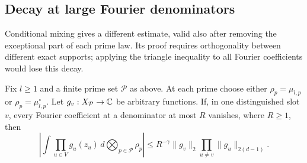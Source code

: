 \subsection{Decay at large Fourier denominators}

Conditional mixing gives a different estimate, valid also after
removing the exceptional part of each prime law.  Its proof requires
orthogonality between different exact supports; applying the triangle
inequality to all Fourier coefficients would lose this decay.

\begin{lemma}
\label{lem:large-denominator}
Fix \(l\ge1\) and a finite prime set \(\mathcal P\) as above.  At
each prime choose either \(\rho_p=\mu_{l,p}\) or
\(\rho_p=\mu_{l,p}^{\circ}\).  Let \(g_v:X_{\mathcal P}\to\mathbb C\)
be arbitrary functions.  If, in one distinguished slot \(v\), every
Fourier coefficient at a denominator at most \(R\) vanishes, where
\(R\ge1\), then
\begin{equation}
 \left|\int\prod_{u\in V}g_u(z_u)\,
                  d\bigotimes_{p\in\mathcal P}\rho_p\right|
 \le R^{-\gamma}\|g_v\|_2
                     \prod_{u\ne v}\|g_u\|_{2(d-1)}.
 \label{eq:large-denominator}
\end{equation}
\end{lemma}

